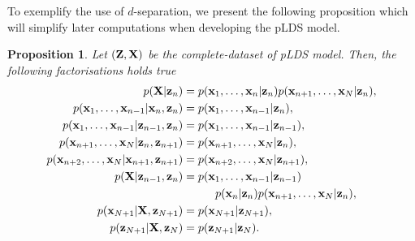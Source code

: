 \documentclass[11pt]{article}
\numberwithin{equation}{section}
\newcommand{\x}{{\bf x}}
\newcommand{\z}{{\bf z}}
\newtheorem{proposition}{Proposition}[section]
\begin{document}
To exemplify the use of $d$-separation, we present the following proposition which will simplify later computations when developing the pLDS model.

\begin{proposition} \label{prop:graphical-models-separation}
	Let $({\bf Z}, {\bf X})$ be the complete-dataset of pLDS model. Then, the following factorisations holds true
	\begin{align}
		p({\bf X}\vert\z_n) &= p({\x_1, \ldots, \x_n \vert \z_n})p({\x_{n+1}, \ldots, \x_N \vert \z_n}), \label{eq:gm-1}\\
		p(\x_1, \ldots, \x_{n-1}\vert \x_n, \z_n) &= p(\x_1, \ldots, \x_{n-1}\vert \z_n), \label{eq:gm-2}\\
		p(\x_1, \ldots, \x_{n-1}\vert \z_{n-1}, \z_{n}) &= p(\x_1, \ldots, \x_{n-1}\vert \z_{n-1}), \label{eq:gm-3}\\
		p(\x_{n+1}, \ldots, \x_N \vert \z_n, \z_{n+1}) &= p(\x_{n+1}, \ldots, \x_N \vert \z_n), \label{eq:gm-4}\\
		p(\x_{n+2}, \ldots, \x_N\vert \x_{n+1}, \z_{n+1}) &= p(\x_{n+2}, \ldots, \x_N \vert \z_{n+1}),\label{eq:gm-5}\\
		p({\bf X}\vert \z_{n-1}, \z_{n}) &= p(\x_1, \ldots, \x_{n-1}\vert \z_{n-1}) \nonumber\\
			&\hspace{1cm}p(\x_n\vert \z_n) p(\x_{n+1}, \ldots, \x_N \vert \z_n), \label{eq:gm-6}\\
		p(\x_{N+1} \vert {\bf X}, \z_{N+1}) &= p(\x_{N+1} \vert \z_{N+1}), \label{eq:gm-7}\\
		p(\z_{N+1} \vert {\bf X}, \z_{N}) &= p(\z_{N+1} \vert \z_{N}). \label{eq:gm-8}\\
	\end{align}
\end{proposition}
\end{document}
